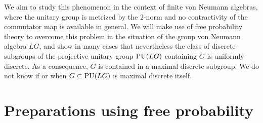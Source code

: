 \documentclass[pdftex]{sigma}
\numberwithin{equation}{section}
\begin{document}
We aim to study this phenomenon in the context of finite von Neumann algebras, where the unitary group is metrized by the $2$-norm and no contractivity of the commutator map is available in general. We will make use of free probability theory to overcome this problem in the situation of the group von Neumann algebra $LG$, and show in many cases that nevertheless the class of discrete subgroups of the projective unitary group ${\rm PU}(LG)$ containing $G$ is uniformly discrete. As a consequence, $G$ is contained in a maximal discrete subgroup. We do not know if or when $G \subset {\rm PU}(LG)$ is maximal discrete itself.

\section{Preparations using free probability}
\end{document}
